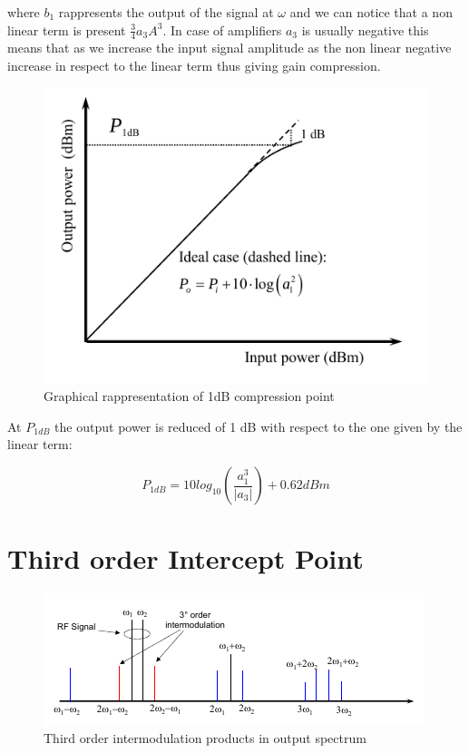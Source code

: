 where $b_1$ rappresents the output of the signal at $\omega$ and we can notice that a non linear term is present $\frac{3}{4}a_3A^3$.
In case of amplifiers $a_3$ is usually negative this means that as we increase the input signal amplitude as the non linear negative increase in respect to the linear term thus giving gain compression.

\begin{figure}[ht]
	\centering
	\includegraphics[scale=0.5]{Immagini/1db}
	\caption{Graphical rappresentation of 1dB compression point}
	\label{fig:1db}
\end{figure}


At $P_{1dB}$ the output power is reduced of 1 dB with respect to the one given by the linear term:

\begin{equation}
	P_{1dB}= 10log_{10}\left( \frac{a_1^3}{|a_3|} \right)+0.62dBm
\end{equation}



\section{Third order Intercept Point} %
\label{sec:third_order_intercept_point}

\begin{figure}[ht]
	\centering
	\includegraphics[scale=0.8]{Immagini/spec}
	\caption{Third order intermodulation products in output spectrum}
	\label{fig:spec}
\end{figure}


